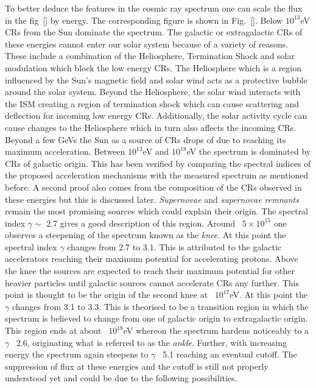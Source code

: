 To better deduce the features in the cosmic ray spectrum one can scale the flux in the fig~\ref{} by energy. The corresponding figure is shown in Fig.~\ref{}. Below $10^{13}$eV CRs from the Sun dominate the spectrum. The galactic or extragalactic CRs of these energies cannot enter our solar system because of a variety of reasons. These include a combination of the Heliosphere, Termination Shock and solar modulation which block the low energy CRs. The Heliosphere which is a region influenced by the Sun's magnetic field and solar wind acts as a protective bubble around the solar system. Beyond the Heliosphere, the solar wind interacts with the ISM creating a region of termination shock which can cause scattering and deflection for incoming low energy CRs. Additionally, the solar activity cycle can cause changes to the Heliosphere which in turn also affects the incoming CRs. Beyond a few GeVs the Sun as a source of CRs drops of due to reaching its maximum acceleration. Between $10^{13}$eV and $10^{18}$eV the spectrum is dominated by CRs of galactic origin. This has been verified by comparing the spectral indices of the proposed acceleration mechanisms with the measured spectrum as mentioned before. A second proof also comes from the composition of the CRs observed in these energies but this is discussed later. \textit{Supernovae} and \textit{supernovae remnants} remain the most promising sources which could explain their origin. The spectral index $\gamma \sim$ 2.7 gives a good description of this region. Around ~$5 \times 10^{15}$ one observes a steepening of the spectrum known as the \textit{knee}. At this point the spectral index $\gamma$ changes from 2.7 to 3.1. This is attributed to the galactic accelerators reaching their maximum potential for accelerating protons. Above the knee the sources are expected to reach their maximum potential for other heavier particles until galactic sources cannot accelerate CRs any further. This point is thought to be the origin of the second knee at ~$10^{17}$eV. At this point the $\gamma$ changes from 3.1 to 3.3. This is theorised to be a transition region in which the spectrum is believed to change from one of galactic origin to extragalactic origin. This region ends at about ~$10^{18}$eV whereon the spectrum hardens noticeably to a $\gamma$ ~2.6, originating what is referred to as the \textit{ankle}. Further, with increasing energy the spectrum again steepens to $\gamma$ ~5.1 reaching an eventual cutoff. The suppression of flux at these energies and the cutoff is still not properly understood yet and could be due to the following possibilities.

